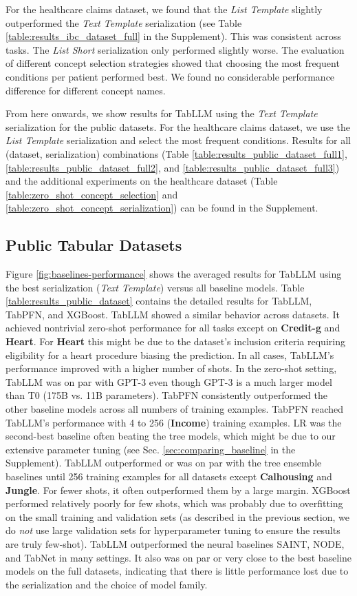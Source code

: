 For the healthcare claims dataset, we found that the \textit{List Template} slightly outperformed the \textit{Text Template} serialization (see Table \ref{table:results_ibc_dataset_full} in the Supplement). This was consistent across tasks. The \textit{List Short} serialization only performed slightly worse. The evaluation of different concept selection strategies showed that choosing the most frequent conditions per patient performed best. We found no considerable performance difference for different concept names.

From here onwards, we show results for TabLLM using the \textit{Text Template} serialization for the public datasets. For the healthcare claims dataset, we use the \textit{List Template} serialization and select the most frequent conditions. Results for all (dataset, serialization) combinations (Table \ref{table:results_public_dataset_full1}, \ref{table:results_public_dataset_full2}, and \ref{table:results_public_dataset_full3}) and the additional experiments on the healthcare dataset (Table \ref{table:zero_shot_concept_selection} and 
\ref{table:zero_shot_concept_serialization}) can be found in the Supplement.

\subsection{Public Tabular Datasets} Figure \ref{fig:baselines-performance} shows the averaged results for TabLLM using the best serialization (\textit{Text Template}) versus all baseline models. Table \ref{table:results_public_dataset} contains the detailed results for TabLLM, TabPFN, and XGBoost. TabLLM showed a similar behavior across datasets. It achieved nontrivial zero-shot performance for all tasks except on \textbf{Credit-g} and \textbf{Heart}.
For \textbf{Heart} this might be due to the dataset's inclusion criteria requiring eligibility for a heart procedure biasing the prediction. In all cases, TabLLM's performance improved with a higher number of shots. In the zero-shot setting, TabLLM was on par with GPT-3 even though GPT-3 is a much larger model than T0 (175B vs. 11B parameters). TabPFN consistently outperformed the other baseline models across all numbers of training examples. TabPFN reached TabLLM's performance with 4 to 256 (\textbf{Income}) training examples. LR was the second-best baseline often beating the tree models, which might be due to our extensive parameter tuning (see Sec. \ref{sec:comparing_baseline} in the Supplement). TabLLM outperformed or was on par with the tree ensemble baselines until 256 training examples for all datasets except \textbf{Calhousing} and \textbf{Jungle}.
For fewer shots, it often outperformed them by a large margin. XGBoost performed relatively poorly for few shots, which was probably due to overfitting on the small training and validation sets (as described in the previous section, we do \emph{not} use large validation sets for hyperparameter tuning to ensure the results are truly few-shot). TabLLM outperformed the neural baselines SAINT, NODE, and TabNet in many settings. It also was on par or very close to the best baseline models on the full datasets, indicating that there is little performance lost due to the serialization and the choice of model family.


